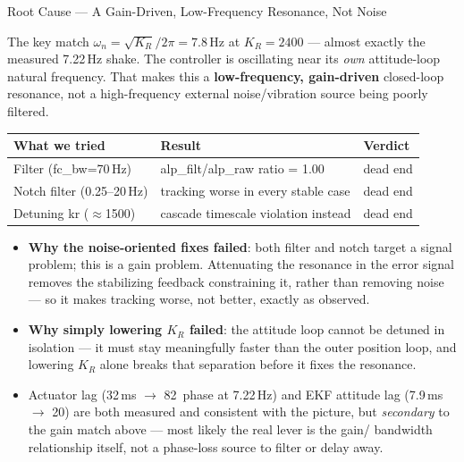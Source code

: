 \documentclass[aspectratio=169,11pt]{beamer}
\begin{document}
\begin{frame}{Root Cause --- A Gain-Driven, Low-Frequency Resonance, Not Noise}
\begin{block}{The key match}
$\omega_n=\sqrt{K_R}/2\pi = 7.8$\,Hz at $K_R=2400$ --- almost exactly the measured 7.22\,Hz
shake. The controller is oscillating near its \emph{own} attitude-loop natural frequency. That
makes this a \textbf{low-frequency, gain-driven} closed-loop resonance, not a high-frequency
external noise/vibration source being poorly filtered.
\end{block}
\vspace{0.1cm}
\centering
\renewcommand{\arraystretch}{1.05}
\begin{small}
\begin{tabular}{lll}
\toprule
What we tried & Result & Verdict \\
\midrule
Filter (fc\_bw=70\,Hz) & alp\_filt/alp\_raw ratio = 1.00 & dead end \\
Notch filter (0.25--20\,Hz) & tracking worse in every stable case & dead end \\
Detuning kr ($\approx$1500) & cascade timescale violation instead & dead end \\
\bottomrule
\end{tabular}
\end{small}
\vspace{0.1cm}

\begin{tiny}
\begin{itemize}
\setlength{\itemsep}{0.05cm}
\item \textbf{Why the noise-oriented fixes failed}: both filter and notch target a signal
      problem; this is a gain problem. Attenuating the resonance in the error signal removes the
      stabilizing feedback constraining it, rather than removing noise --- so it makes tracking
      worse, not better, exactly as observed.
\item \textbf{Why simply lowering $K_R$ failed}: the attitude loop cannot be detuned in
      isolation --- it must stay meaningfully faster than the outer position loop, and lowering
      $K_R$ alone breaks that separation before it fixes the resonance.
\item Actuator lag (32\,ms $\to$ 82\textdegree\ phase at 7.22\,Hz) and EKF attitude lag
      (7.9\,ms $\to$ 20\textdegree) are both measured and consistent with the picture, but
      \emph{secondary} to the gain match above --- most likely the real lever is the gain/
      bandwidth relationship itself, not a phase-loss source to filter or delay away.
\end{itemize}
\end{tiny}
\end{frame}
\end{document}
